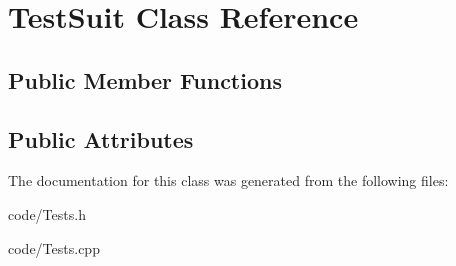 \hypertarget{class_test_suit}{}\section{Test\+Suit Class Reference}
\label{class_test_suit}
\subsection*{Public Member Functions}
\begin{DoxyCompactItemize}
\end{DoxyCompactItemize}
\subsection*{Public Attributes}
\begin{DoxyCompactItemize}
\end{DoxyCompactItemize}


The documentation for this class was generated from the following files\+:\begin{DoxyCompactItemize}
\item 
code/Tests.\+h\item 
code/Tests.\+cpp\end{DoxyCompactItemize}
